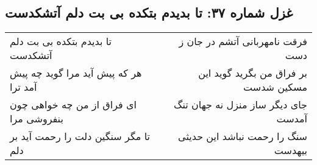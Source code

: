 \begin{center}
\section*{غزل شماره ۳۷: تا بدیدم بتکده بی بت دلم آتشکدست}
\label{sec:037}
\begin{longtable}{l p{0.5cm} r}
تا بدیدم بتکده بی بت دلم آتشکدست
&&
فرقت نامهربانی آتشم در جان ز دست
\\
هر که پیش آید مرا گوید چه پیش آمد ترا
&&
بر فراق من بگرید گوید این مسکین شدست
\\
ای فراق از من چه خواهی چون بنفروشی مرا
&&
جای دیگر ساز منزل نه جهان تنگ آمدست
\\
تا مگر سنگین دلت را رحمت آید بر دلم
&&
سنگ را رحمت نباشد این حدیثی بیهدست
\\
\end{longtable}
\end{center}
